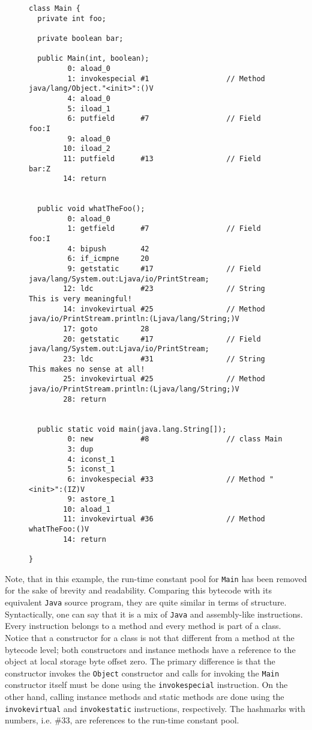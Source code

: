 \begin{figure}[H]
\centering 
\begin{lstlisting}
class Main {
  private int foo;

  private boolean bar;

  public Main(int, boolean);
         0: aload_0
         1: invokespecial #1                  // Method java/lang/Object."<init>":()V
         4: aload_0
         5: iload_1
         6: putfield      #7                  // Field foo:I
         9: aload_0
        10: iload_2
        11: putfield      #13                 // Field bar:Z
        14: return


  public void whatTheFoo();
         0: aload_0
         1: getfield      #7                  // Field foo:I
         4: bipush        42
         6: if_icmpne     20
         9: getstatic     #17                 // Field java/lang/System.out:Ljava/io/PrintStream;
        12: ldc           #23                 // String This is very meaningful!
        14: invokevirtual #25                 // Method java/io/PrintStream.println:(Ljava/lang/String;)V
        17: goto          28
        20: getstatic     #17                 // Field java/lang/System.out:Ljava/io/PrintStream;
        23: ldc           #31                 // String This makes no sense at all!
        25: invokevirtual #25                 // Method java/io/PrintStream.println:(Ljava/lang/String;)V
        28: return


  public static void main(java.lang.String[]);
         0: new           #8                  // class Main
         3: dup
         4: iconst_1
         5: iconst_1
         6: invokespecial #33                 // Method "<init>":(IZ)V
         9: astore_1
        10: aload_1
        11: invokevirtual #36                 // Method whatTheFoo:()V
        14: return

}
\end{lstlisting}
\caption{}
\label{}
\end{figure}

Note, that in this example, the run-time constant pool for \texttt{Main} has been removed for the sake of brevity and readability.
Comparing this bytecode with its equivalent \texttt{Java} source program, they are quite similar in terms of structure.
Syntactically, one can say that it is a mix of \texttt{Java} and assembly-like instructions. Every instruction belongs to a
method and every method is part of a class. Notice that a constructor for a class is not that different from a method at
the bytecode level; both constructors and instance methods have a reference to the object at local storage byte offset zero.
The primary difference is that the constructor invokes the \texttt{Object} constructor and calls
for invoking the \texttt{Main} constructor itself must be done using the \texttt{invokespecial} instruction. On the other
hand, calling instance methods and static methods are done using the \texttt{invokevirtual} and \texttt{invokestatic} instructions,
respectively. The hashmarks with numbers, i.e. \#33, are references to the run-time constant pool.

